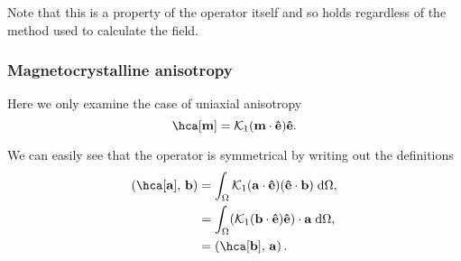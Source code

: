 Note that this is a property of the operator itself and so holds regardless of the method used to calculate the field.


\subsubsection{Magnetocrystalline anisotropy}

Here we only examine the case of uniaxial anisotropy
\begin{equation}
  \hca[\mv] = \kone (\mv \cdot \ev) \ev.
\end{equation}

We can easily see that the operator is symmetrical by writing out the definitions
\begin{equation}
  \begin{aligned}
    \ip{\hca[\av]}{\bv} &= \intd{ \kone (\av \cdot \ev) (\ev \cdot \bv)}, \\
    &= \intd{(\kone(\bv \cdot \ev) \ev) \cdot \av}, \\
    &= \ip{\hca[\bv]}{\av}.
  \end{aligned}
\end{equation}


